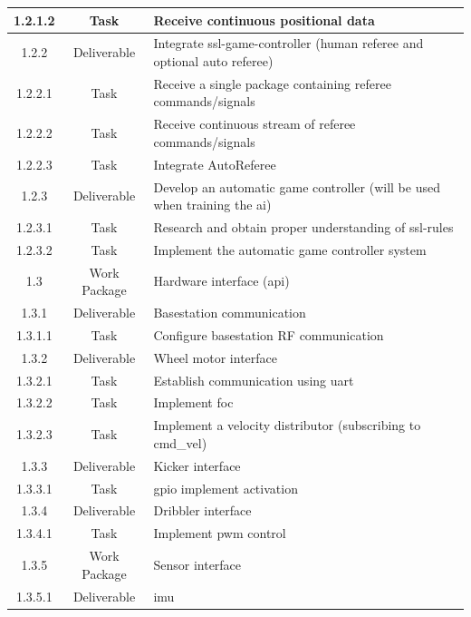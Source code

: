 \begin{longtable}{|c|c|m{}|}
    \rowcolor{c1-t} 1.2.1.2 & Task & Receive continuous positional data \\ \hline
    \rowcolor{c1-d} 1.2.2 & Deliverable & Integrate ssl-game-controller (human referee and optional auto referee) \\ \hline
    \rowcolor{c1-t} 1.2.2.1 & Task & Receive a single package containing referee commands/signals \\ \hline
    \rowcolor{c1-t} 1.2.2.2 & Task & Receive continuous stream of referee commands/signals \\ \hline
    \rowcolor{c1-t} 1.2.2.3 & Task & Integrate AutoReferee \\ \hline
    \rowcolor{c1-d} 1.2.3 & Deliverable & Develop an automatic game controller (will be used when training the \acs{ai}) \\ \hline
    \rowcolor{c1-t} 1.2.3.1 & Task & Research and obtain proper understanding of \acs{ssl}-rules \\ \hline
    \rowcolor{c1-t} 1.2.3.2 & Task & Implement the automatic game controller system \\ \hline
    \rowcolor{c1-wp} 1.3 & Work Package & Hardware interface (\acs{api}) \\ \hline
    \rowcolor{c1-d} 1.3.1 & Deliverable & Basestation communication\\ \hline
    \rowcolor{c1-t} 1.3.1.1 & Task & Configure basestation RF communication\\ \hline
    \rowcolor{c1-d} 1.3.2 & Deliverable & Wheel motor interface \\ \hline
    \rowcolor{c1-t} 1.3.2.1 & Task & Establish communication using \acs{uart} \\ \hline
    \rowcolor{c1-t} 1.3.2.2 & Task & Implement \acs{foc} \\ \hline
    \rowcolor{c1-t} 1.3.2.3 & Task & Implement a velocity distributor (subscribing to cmd\_vel) \\ \hline
    \rowcolor{c1-d} 1.3.3 & Deliverable & Kicker interface \\ \hline
    \rowcolor{c1-t} 1.3.3.1 & Task & \acs{gpio} implement activation \\ \hline
    \rowcolor{c1-d} 1.3.4 & Deliverable & Dribbler interface \\ \hline
    \rowcolor{c1-t} 1.3.4.1 & Task & Implement \acs{pwm} control \\ \hline
    \rowcolor{c1-wp} 1.3.5 & Work Package & Sensor interface \\ \hline
    \rowcolor{c1-d} 1.3.5.1 & Deliverable & \acs{imu} \\ \hline

\end{longtable}
